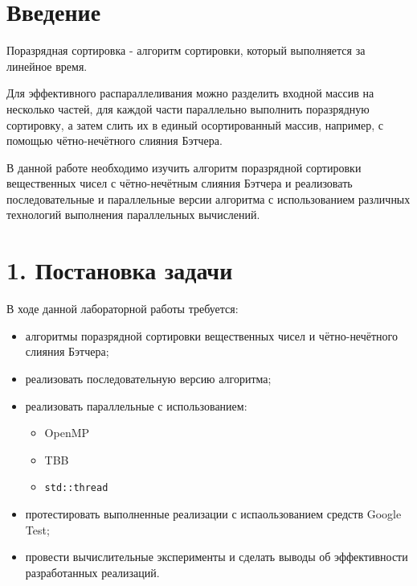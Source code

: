 \documentclass{report}
\begin{document}
    \newpage
    \section*{Введение}
    \par Поразрядная сортировка - алгоритм  сортировки, который выполняется за линейное время.
    \par Для эффективного распараллеливания можно разделить входной массив на несколько частей, для каждой части параллельно выполнить поразрядную сортировку, а затем слить их в единый осортированный массив, например, с помощью чётно-нечётного слияния Бэтчера. 
    \par В данной работе необходимо изучить алгоритм поразрядной сортировки вещественных чисел с чётно-нечётным слияния Бэтчера и реализовать последовательные и параллельные версии алгоритма с использованием различных технологий выполнения параллельных вычислений.

    \newpage
    \section*{1. Постановка задачи}
    В ходе данной лабораторной работы требуется:
    \begin{itemize}
        \item алгоритмы поразрядной сортировки вещественных чисел и чётно-нечётного слияния Бэтчера;
        \item реализовать последовательную версию алгоритма;
        \item реализовать параллельные с использованием:
        \begin{itemize}
            \item OpenMP
            \item TBB
            \item \verb|std::thread|
        \end{itemize}
        \item протестировать выполненные реализации с испаользованием средств Google Test;
        \item провести вычислительные эксперименты и сделать выводы об эффективности разработанных реализаций.
    \end{itemize}
\end{document}
